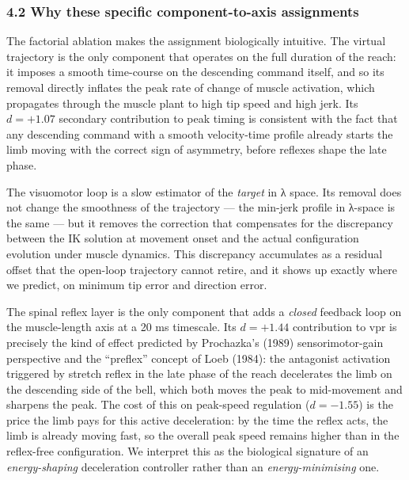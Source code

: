 \documentclass[
  11pt,
]{article}
\begin{document}
\hypertarget{why-these-specific-component-to-axis-assignments}{%
\subsubsection{4.2 Why these specific component-to-axis
assignments}\label{why-these-specific-component-to-axis-assignments}}

The factorial ablation makes the assignment biologically intuitive. The
virtual trajectory is the only component that operates on the full
duration of the reach: it imposes a smooth time-course on the descending
command itself, and so its removal directly inflates the peak rate of
change of muscle activation, which propagates through the muscle plant
to high tip speed and high jerk. Its \(d = +1.07\) secondary
contribution to peak timing is consistent with the fact that any
descending command with a smooth velocity-time profile already starts
the limb moving with the correct sign of asymmetry, before reflexes
shape the late phase.

The visuomotor loop is a slow estimator of the \emph{target} in λ space.
Its removal does not change the smoothness of the trajectory --- the
min-jerk profile in λ-space is the same --- but it removes the
correction that compensates for the discrepancy between the IK solution
at movement onset and the actual configuration evolution under muscle
dynamics. This discrepancy accumulates as a residual offset that the
open-loop trajectory cannot retire, and it shows up exactly where we
predict, on minimum tip error and direction error.

The spinal reflex layer is the only component that adds a \emph{closed}
feedback loop on the muscle-length axis at a 20 ms timescale. Its
\(d = +1.44\) contribution to vpr is precisely the kind of effect
predicted by Prochazka's (1989) sensorimotor-gain perspective and the
``preflex'' concept of Loeb (1984): the antagonist activation triggered
by stretch reflex in the late phase of the reach decelerates the limb on
the descending side of the bell, which both moves the peak to
mid-movement and sharpens the peak. The cost of this on peak-speed
regulation (\(d = -1.55\)) is the price the limb pays for this active
deceleration: by the time the reflex acts, the limb is already moving
fast, so the overall peak speed remains higher than in the reflex-free
configuration. We interpret this as the biological signature of an
\emph{energy-shaping} deceleration controller rather than an
\emph{energy-minimising} one.
\end{document}
